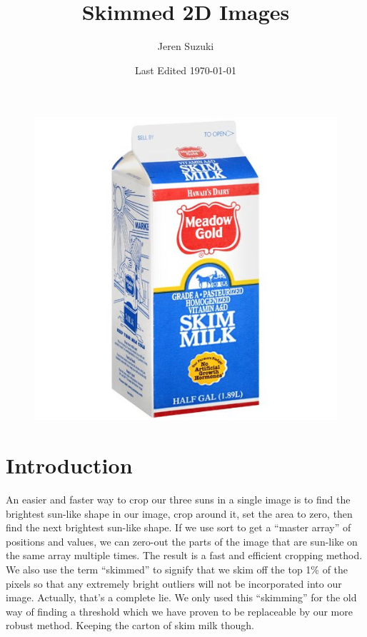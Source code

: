 \documentclass[10pt]{scrartcl}
\title{Skimmed 2D Images}
\author{Jeren Suzuki}
\date{Last Edited \today}
\begin{document}
\maketitle

\begin{figure}[!ht]
    \centering
    \includegraphics[width=.9\textwidth]{../plots_tables_images/skimmilk.jpg}    
\end{figure}

\clearpage

\tableofcontents
\clearpage
{}

\section{Introduction} %
\label{sec:introduction}
An easier and faster way to crop our three suns in a single image is to find the brightest sun-like shape in our image, crop around it, set the area to zero, then find the next brightest sun-like shape. If we use sort to get a ``master array'' of positions and values, we can zero-out the parts of the image that are sun-like on the same array multiple times. The result is a fast and efficient cropping method. We also use the term ``skimmed'' to signify that we skim off the top 1\% of the pixels so that any extremely bright outliers will not be incorporated into our image. Actually, that's a complete lie. We only used this ``skimming'' for the old way of finding a threshold which we have proven to be replaceable by our more robust method. Keeping the carton of skim milk though.
\end{document}
